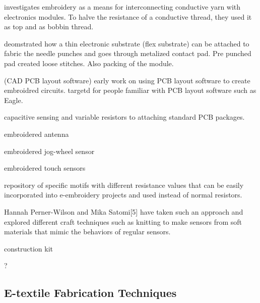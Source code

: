 \cite{linz2008embroidered} investigates embroidery as a means for interconnecting conductive yarn with electronics modules.
To halve the resistance of a conductive thread, they used it as top and as bobbin thread.

\cite{linz2005embroidering} deomstrated how a thin electronic substrate (flex substrate) can be attached to fabric the needle punches and  goes through metalized contact pad. Pre punched pad created loose stitches. Also packing of the module.

\cite{eichinger2007using} (CAD PCB layout software) early work on using PCB layout software to create embroidred circuits. targetd for people familiar with PCB layout software such as Eagle.




capacitive sensing and variable resistors to attaching standard PCB packages.

\cite{brechet2017cost} embroidered antenna

\cite{zeagler2012textile} embroidered jog-wheel sensor

\cite{roh2014textile} embroidered touch sensors  


\cite{Gowrishankar:2013:PRE:2493988.2494341} repository of specific motifs
with different resistance values that can be easily
incorporated into e-embroidery projects and used instead of
normal resistors. 


 Hannah Perner-Wilson and Mika Satomi[5]
have taken such an approach and explored different craft
techniques such as knitting to make sensors from soft
materials that mimic the behaviors of regular sensors. 

\cite{buechley2005quilt} construction kit

\cite{linz2006fully} ?


\subsection{E-textile Fabrication Techniques}

